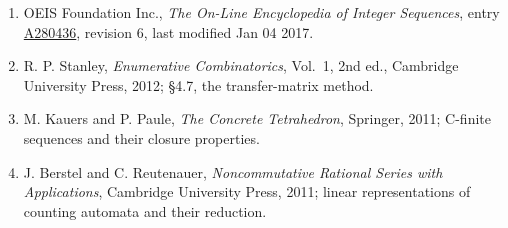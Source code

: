 \documentclass[11pt]{article}
\theoremstyle{definition}
\begin{document}
\begin{enumerate}

\item OEIS Foundation Inc., \emph{The On-Line Encyclopedia of Integer Sequences}, entry \href{https://oeis.org/A280436}{A280436}, revision 6, last modified Jan 04 2017.

\item R. P. Stanley, \emph{Enumerative Combinatorics}, Vol.~1, 2nd ed., Cambridge University Press, 2012; \S4.7, the transfer-matrix method.

\item M. Kauers and P. Paule, \emph{The Concrete Tetrahedron}, Springer, 2011; C-finite sequences and their closure properties.

\item J. Berstel and C. Reutenauer, \emph{Noncommutative Rational Series with Applications}, Cambridge University Press, 2011; linear representations of counting automata and their reduction.

\end{enumerate}
\end{document}

